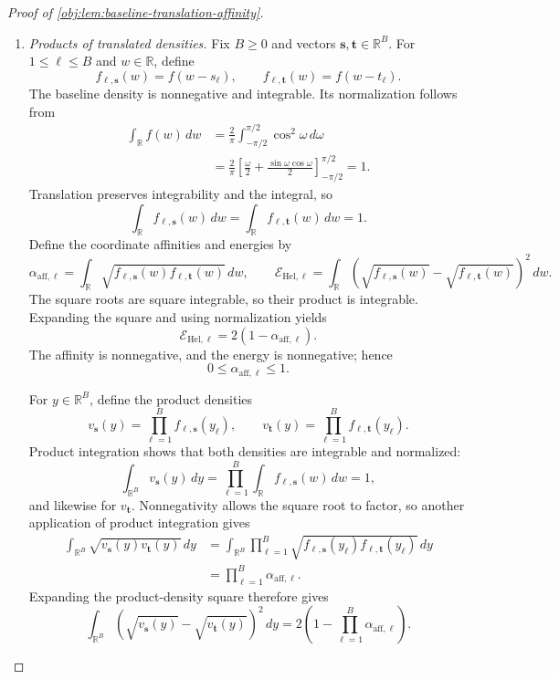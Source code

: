 \begin{proof}[Proof of \cref{obj:lem:baseline-translation-affinity}]
\begin{enumerate}
\item \emph{Products of translated densities.}
Fix \(B\ge0\) and vectors \(\boldsymbol s,\boldsymbol t\in\mathbb R^B\). For \(1\le\ell\le B\) and \(w\in\mathbb R\), define
\[
f_{\ell,\boldsymbol s}(w)=f(w-s_\ell),
\qquad
f_{\ell,\boldsymbol t}(w)=f(w-t_\ell).
\]
The baseline density is nonnegative and integrable. Its normalization follows from
\[
\begin{aligned}
\int_{\mathbb R}f(w)\,dw
&=\frac{2}{\pi}\int_{-\pi/2}^{\pi/2}\cos^2\omega\,d\omega\\
&=\frac{2}{\pi}
  \left[\frac{\omega}{2}
        +\frac{\sin\omega\cos\omega}{2}\right]_{-\pi/2}^{\pi/2}
=1.
\end{aligned}
\]
Translation preserves integrability and the integral, so
\[
\int_{\mathbb R}f_{\ell,\boldsymbol s}(w)\,dw
=\int_{\mathbb R}f_{\ell,\boldsymbol t}(w)\,dw=1.
\]
Define the coordinate affinities and energies by
\[
\alpha_{\mathrm{aff},\ell}
=\int_{\mathbb R}
\sqrt{f_{\ell,\boldsymbol s}(w)f_{\ell,\boldsymbol t}(w)}\,dw,
\qquad
\mathcal E_{\mathrm{Hel},\ell}
=\int_{\mathbb R}
\left(\sqrt{f_{\ell,\boldsymbol s}(w)}
      -\sqrt{f_{\ell,\boldsymbol t}(w)}\right)^2\,dw.
\]
The square roots are square integrable, so their product is integrable. Expanding the square and using normalization yields
\[
\mathcal E_{\mathrm{Hel},\ell}
=2(1-\alpha_{\mathrm{aff},\ell}).
\]
The affinity is nonnegative, and the energy is nonnegative; hence
\[
0\le\alpha_{\mathrm{aff},\ell}\le1.
\]

For \(y\in\mathbb R^B\), define the product densities
\[
v_{\boldsymbol s}(y)=\prod_{\ell=1}^B f_{\ell,\boldsymbol s}(y_\ell),
\qquad
v_{\boldsymbol t}(y)=\prod_{\ell=1}^B f_{\ell,\boldsymbol t}(y_\ell).
\]
Product integration shows that both densities are integrable and normalized:
\[
\int_{\mathbb R^B}v_{\boldsymbol s}(y)\,dy
=\prod_{\ell=1}^B\int_{\mathbb R}f_{\ell,\boldsymbol s}(w)\,dw=1,
\]
and likewise for \(v_{\boldsymbol t}\).
Nonnegativity allows the square root to factor, so another application of product integration gives
\[
\begin{aligned}
\int_{\mathbb R^B}\sqrt{v_{\boldsymbol s}(y)v_{\boldsymbol t}(y)}\,dy
&=\int_{\mathbb R^B}
\prod_{\ell=1}^B
\sqrt{f_{\ell,\boldsymbol s}(y_\ell)
      f_{\ell,\boldsymbol t}(y_\ell)}\,dy\\
&=\prod_{\ell=1}^B\alpha_{\mathrm{aff},\ell}.
\end{aligned}
\]
Expanding the product-density square therefore gives
\[
\int_{\mathbb R^B}
\left(\sqrt{v_{\boldsymbol s}(y)}
      -\sqrt{v_{\boldsymbol t}(y)}\right)^2\,dy
=2\left(1-\prod_{\ell=1}^B\alpha_{\mathrm{aff},\ell}\right).
\]


\end{enumerate}
\end{proof}
